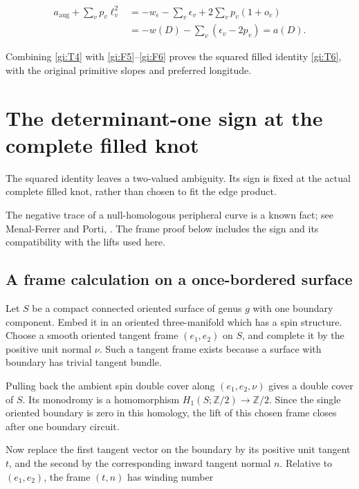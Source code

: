 \begin{equation}\label{gi:F6}
\begin{aligned}
 a_{\mathrm{aug}}+\sum_vp_v\ell_v^2
  &=-w_\epsilon-\sum_v\epsilon_v+2\sum_vp_v(1+o_v)\\
  &=-w(D)-\sum_v(\epsilon_v-2p_v)=a(D).
\end{aligned}
\end{equation}

Combining \eqref{gi:T4} with \eqref{gi:F5}--\eqref{gi:F6} proves the squared filled
identity \eqref{gi:T6}, with the original primitive slopes and
preferred longitude.

\section{The determinant-one sign at the complete filled knot}\label{gi:the-determinant-one-sign-at-the-complete-filled-knot}

The squared identity leaves a two-valued ambiguity. Its sign is
fixed at the actual complete filled knot, rather than chosen
to fit the edge product.

The negative trace of a null-homologous peripheral curve is a known
fact; see Menal-Ferrer and Porti,
\cite[Corollary 3.10]{MenalFerrerPorti2012}.
The frame proof below includes the sign and its compatibility with
the lifts used here.

\subsection{A frame calculation on a once-bordered surface}\label{gi:a-frame-calculation-on-a-once-bordered-surface}

Let \(S\) be a compact connected oriented surface of genus \(g\)
with one boundary component. Embed it in an oriented three-manifold
which has a spin structure. Choose a smooth oriented tangent frame
\((e_1,e_2)\) on \(S\), and complete it by the positive unit normal
\(\nu\). Such a tangent frame exists because a surface with
boundary has trivial tangent bundle.

Pulling back the ambient spin double cover along
\((e_1,e_2,\nu)\) gives a double cover of \(S\).
Its monodromy is a homomorphism
\(H_1(S;\mathbb Z/2)\to\mathbb Z/2\).
Since the single oriented boundary is zero in this homology,
the lift of this chosen frame closes after one boundary circuit.

Now replace the first tangent vector on the boundary by its positive
unit tangent \(t\), and the second by the corresponding inward
tangent normal \(n\). Relative to \((e_1,e_2)\), the
frame \((t,n)\) has winding number

